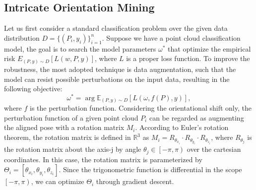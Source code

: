 \subsection{Intricate Orientation Mining}
Let us first consider a standard classification problem over the given data distribution $D = {\{(P_i, y_i)}\}^{n}_{i=1}$. Suppose we have a point cloud classification model, the goal is to search the model parameters $\omega^*$ that optimize the empirical risk $E_{(P, y)\sim D}\left[L(w, P, y)\right]$, where $L$ is a proper loss function. To improve the robustness, the most adopted technique is data augmentation, such that the model can resist possible perturbations on the input data, resulting in the following objective:
\begin{equation}
    \omega^*=\mathop{\arg\min_{\omega}} \mathbb{E}_{(P, y)\sim D} \left[L(\omega, f(P), y)\right],
\end{equation}
where $f$ is the perturbation function. Considering the orientational shift only, the perturbation function of a given point cloud $P_i$ can be regarded as augmenting the aligned pose with a rotation matrix $M_i$. According to Euler's rotation theorem, the rotation matrix is defined in $\mathbb{R}^3$ as $M_i = R_{\theta_{x_i}}\cdot R_{\theta_{y_i}}\cdot R_{\theta_{z_i}}$, 
where $R_{\theta_j}$ is the rotation matrix about the axis-j by angle $\theta_{j} \in \left[-\pi, \pi\right)$ over the cartesian coordinates. In this case, the rotation matrix is parameterized by $\Theta_i=\left[\theta_{x_i}, \theta_{y_i}, \theta_{z_i}\right]$. Since the trigonometric function is differential in the scope $\left[-\pi, \pi\right)$, we can optimize $\Theta_i$ through gradient descent.



